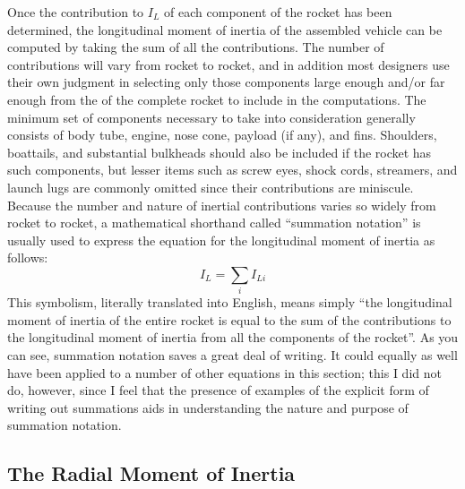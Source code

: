 Once the contribution to $I_L$ of each component of the rocket has been
determined, the longitudinal moment of inertia of the assembled vehicle can
be computed by taking the sum of all the contributions. The number of
contributions will vary from rocket to rocket, and in addition most
designers use their own judgment in selecting only those components large
enough and/or far enough from the \CG{} of the complete rocket to include in
the computations. The minimum set of components necessary to take into
consideration generally consists of body tube, engine, nose cone, payload
(if any), and fins. Shoulders, boattails, and substantial bulkheads should
also be included if the rocket has such components, but lesser items such as
screw eyes, shock cords, streamers, and launch lugs are commonly omitted
since their contributions are miniscule. Because the number and nature of
inertial contributions varies so widely from rocket to rocket, a
mathematical shorthand called ``summation notation'' is usually used to
express the equation for the longitudinal moment of inertia as follows:
\begin{equation}\label{ch2:eq:104}
I_L = \sum_i I_{Li}
\end{equation}
This symbolism, literally translated into English, means simply ``the
longitudinal moment of inertia of the entire rocket is equal to the sum of
the contributions to the longitudinal moment of inertia from all the
components of the rocket''. As you can see, summation notation saves a great
deal of writing. It could equally as well have been applied to a number of
other equations in this section; this I did not do, however, since I feel
that the presence of examples of the explicit form of writing out summations
aids in understanding the nature and purpose of summation notation.

\subsection{The Radial Moment of Inertia}\label{ch2:sec:4.6}

